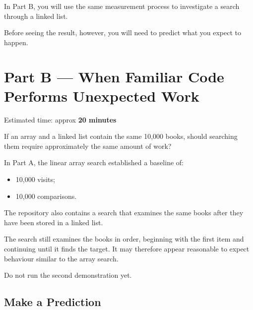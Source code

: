 \documentclass{csc2059practical}
\begin{document}
In Part B, you will use the same measurement process to investigate a search
through a linked list.

Before seeing the result, however, you will need to predict what you expect to
happen.


\section{Part B --- When Familiar Code Performs Unexpected Work}


\begin{infobox}
Estimated time: approx \textbf{20 minutes}
\end{infobox}


\begin{engineeringquestion}
If an array and a linked list contain the same 10,000 books, should searching
them require approximately the same amount of work?
\end{engineeringquestion}

In Part A, the linear array search established a baseline of:

\begin{itemize}
    \item 10,000 visits;
    \item 10,000 comparisons.
\end{itemize}

The repository also contains a search that examines the same books after they
have been stored in a linked list.

The search still examines the books in order, beginning with the first item and
continuing until it finds the target. It may therefore appear reasonable to
expect behaviour similar to the array search.

Do not run the second demonstration yet.


\subsection{Make a Prediction}
\end{document}
